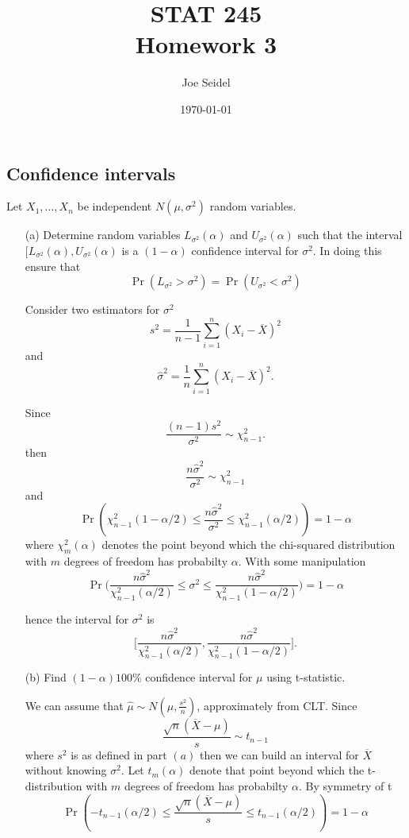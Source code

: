 \documentclass{tufte-book}
\title{STAT  245\\Homework 3}
\author{Joe Seidel}
\date{\today}
\begin{document}
\maketitle
{}
\newpage
{}

\subsection{Confidence intervals}
Let $X_1,...,X_n$ be independent $N(\mu, \sigma^2)$ random variables.

\begin{enumerate}
\item[(a)] Determine random variables $L_{\sigma^2}(\alpha)$ and $U_{\sigma^2}(\alpha)$ such that the interval $[L_{\sigma^2}(\alpha),U_{\sigma^2}(\alpha)$ is a $(1-\alpha)$ confidence interval for $\sigma^2$.  In doing this ensure that
\[ \Pr(L_{\sigma^2}>\sigma^2) = \Pr(U_{\sigma^2} < \sigma^2) \]

Consider two estimators for $\sigma^2$
\[ s^2 = \frac{1}{n-1}\sum_{i=1}^n(X_i-\overline{X})^2 \]
and
\[ \hat{\sigma}^2 = \frac{1}{n}\sum_{i=1}^n(X_i - \overline{X})^2. \]

Since
\[ \frac{(n-1)s^2}{\sigma^2} \sim \chi^2_{n-1}. \]
then
\[ \frac{n\hat{\sigma}^2}{\sigma^2} \sim \chi_{n-1}^2 \]
and
\[ \Pr(\chi_{n-1}^2(1-\alpha/2) \leq \frac{n\hat{\sigma}^2}{\sigma^2} \leq \chi_{n-1}^2(\alpha/2)) = 1-\alpha \]
where $\chi_{m}^2(\alpha)$ denotes the point beyond which the chi-squared distribution with $m$ degrees of freedom has probabilty $\alpha$.  With some manipulation
\[ \Pr\big(\frac{n\hat{\sigma}^2}{\chi_{n-1}^2(\alpha/2)}\leq \sigma^2 \leq \frac{n\hat{\sigma}^2}{\chi_{n-1}^2(1-\alpha/2)}\big) = 1-\alpha \]

hence the interval for $\sigma^2$ is
\[ \big[\frac{n\hat{\sigma}^2}{\chi_{n-1}^2(\alpha/2)},\frac{n\hat{\sigma}^2}{\chi_{n-1}^2(1-\alpha/2)}\Big]. \]

\item[(b)] Find $(1-\alpha)100\%$ confidence interval for $\mu$ using t-statistic.

We can assume that $\hat{\mu} \sim N(\mu, \frac{s^2}{n})$, approximately from CLT.
Since
\[ \frac{\sqrt{n}(\overline{X}-\mu)}{s} \sim t_{n-1} \]
where $s^2$ is as defined in part $(a)$ then we can build an interval for $\overline{X}$ without knowing $\sigma^2$.  Let $t_m(\alpha)$ denote that point beyond which the t-distribution with $m$ degrees of freedom has probabilty $\alpha$. By symmetry of t
\[ \Pr(-t_{n-1}(\alpha/2) \leq \frac{\sqrt{n}(\overline{X}-\mu)}{s} \leq t_{n-1}(\alpha/2) ) = 1-\alpha \]


\end{enumerate}
\end{document}
